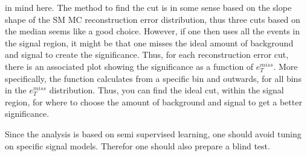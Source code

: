in mind here. The method to find the cut is in some sense based on the slope shape of the SM MC reconstruction 
error distribution, thus three cuts based on the median seems like a good choice. However, if one then uses all 
the events in the signal region, it might be that one misses the ideal amount of background and signal to create 
the significance. Thus, for each reconstruction error cut, there is an associated plot showing the significance 
as a function of $e_T^{miss}$. More specifically, the function calculates from a specific bin and outwards, for all 
bins in the $e_T^{miss}$ distribution. Thus, you can find the ideal cut, within the signal region, for where to 
choose the amount of background and signal to get a better significance.\par 

Since the analysis is based on semi supervised learning, one should avoid tuning on specific signal models.
Therefor one should also prepare a blind test. 
